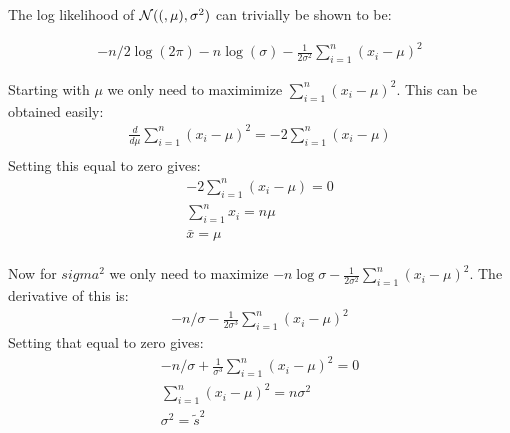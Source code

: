 
The log likelihood of $\mathcal{N}((, \mu), \sigma^2)$ can trivially be shown to be:

\begin{align*}
    -n/2 \log(2\pi) - n\log(\sigma) - \frac{1}{2\sigma^2}\sum_{i=1}^n (x_i-\mu)^2
\end{align*}

Starting with $\mu$ we only need to maximimize $\sum_{i=1}^n (x_i-\mu)^2$. 
This can be obtained easily:
\begin{align*}
    \frac{d}{d\mu}\sum_{i=1}^n (x_i-\mu)^2 = -2\sum_{i=1}^n (x_i-\mu)\\
\end{align*}
Setting this equal to zero gives:
\begin{align*}
    -2\sum_{i=1}^n (x_i-\mu)= 0\\
    \sum_{i=1}^n x_i= n\mu\\
    \bar{x}= \mu\\
\end{align*}

Now for $sigma^2$ we only need to maximize $-n\log{\sigma} -  \frac{1}{2\sigma^2}\sum_{i=1}^n (x_i-\mu)^2$.
The derivative of this is:
\begin{align*}
    -n/\sigma - \frac{1}{2\sigma^3}\sum_{i=1}^n(x_i-\mu)^2
\end{align*}
Setting that equal to zero gives:
\begin{align*}
    -n/\sigma + \frac{1}{\sigma^3}\sum_{i=1}^n(x_i-\mu)^2 = 0\\
    \sum_{i=1}^n (x_i-\mu)^2 = n\sigma^2\\
    \sigma^2 = \tilde{s}^2
\end{align*}



